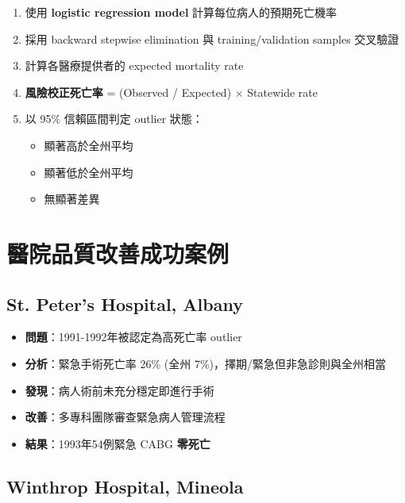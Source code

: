 \documentclass[12pt,a4paper]{article}
\begin{document}
\begin{enumerate}
    \item 使用 \textbf{logistic regression model} 計算每位病人的預期死亡機率
    \item 採用 backward stepwise elimination 與 training/validation samples 交叉驗證
    \item 計算各醫療提供者的 expected mortality rate
    \item \textbf{風險校正死亡率} = (Observed / Expected) × Statewide rate
    \item 以 95\% 信賴區間判定 outlier 狀態：
    \begin{itemize}
        \item 顯著高於全州平均
        \item 顯著低於全州平均
        \item 無顯著差異
    \end{itemize}
\end{enumerate}

\section{醫院品質改善成功案例}


\subsection{St. Peter's Hospital, Albany}

\begin{itemize}
    \item \textbf{問題}：1991-1992年被認定為高死亡率 outlier
    \item \textbf{分析}：緊急手術死亡率 26\% (全州 7\%)，擇期/緊急但非急診則與全州相當
    \item \textbf{發現}：病人術前未充分穩定即進行手術
    \item \textbf{改善}：多專科團隊審查緊急病人管理流程
    \item \textbf{結果}：1993年54例緊急 CABG \textbf{零死亡}
\end{itemize}

\subsection{Winthrop Hospital, Mineola}
\end{document}
